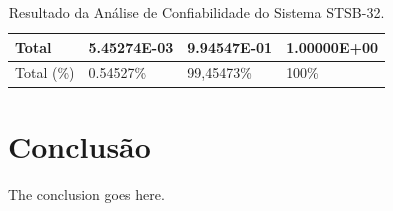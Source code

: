 \documentclass[lettersize,journal]{IEEEtran}
\begin{document}
\begin{table}[!ht]
	\caption{Resultado da Análise de Confiabilidade do Sistema STSB-32.}
	\label{tabela: Resultado_Confiabilidade}
	\centering
	\begin{tabularx}{.5\textwidth}{|Y|Y|Y|Y|}
		\hline
		Total & 5.45274E-03 & 9.94547E-01 & 1.00000E+00 \\ \hline
		Total (\%) & 0.54527\% & 99,45473\% & 100\% \\ \hline
	\end{tabularx}
\end{table}


\section{Conclusão}
The conclusion goes here.


 


\end{document}
